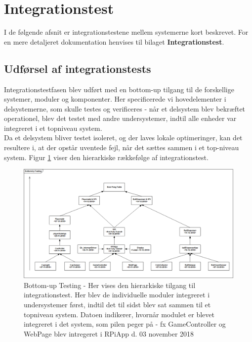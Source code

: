 \documentclass[Rapport/Rapport_main.tex]{subfiles}
\begin{document}
\section{Integrationstest}\label{sec:rap_integrationstest}
I de følgende afsnit er integrationstestene mellem systemerne kort beskrevet. For en mere detaljeret dokumentation henvises til bilaget \textbf{Integrationstest}. 

\subsection{Udførsel af integrationstests}
Integrationstestfasen blev udført med en bottom-up tilgang til de forskellige systemer, moduler og komponenter. Her specificerede vi hovedelementer i delsystemerne, som skulle testes og verificeres - når et delsystem blev bekræftet operationel, blev det testet med andre undersystemer, indtil alle enheder var integreret i et topniveau system. \\
Da et delsystem bliver testet isoleret, og der laves lokale optimeringer, kan det resultere i, at der opstår uventede fejl, når det sættes sammen i et top-niveau system. Figur \ref{fig:Bottom-Up} viser den hierarkiske rækkefølge af integrationstest. 
\begin{figure}[H]
    \centering
    \includegraphics[width=1\textwidth]{Rapport/Test/graphics/Buttom-Up.png}
    \caption{Bottom-up Testing - Her vises den hierarkiske tilgang til integrationstest. Her blev de individuelle moduler integreret i undersystemer først, indtil det til sidst blev sat sammen til et topniveau system. Datoen indikerer, hvornår modulet er blevet integreret i det system, som pilen peger på - fx GameController og WebPage blev intregeret i RPiApp d. 03 november 2018}
   \label{fig:Bottom-Up}
\end{figure}
\end{document}
